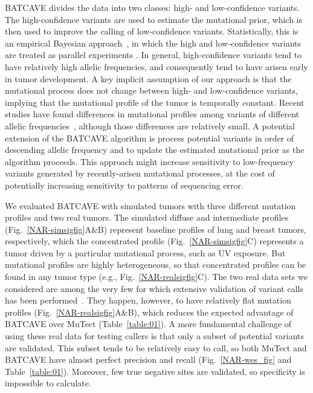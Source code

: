 \documentclass[a4,center,fleqn]{NAR}
\newcommand{\batcave}{BATCAVE\xspace}
\begin{document}
\batcave divides the data into two classes: high- and low-confidence variants.
The high-confidence variants are used to estimate the mutational prior, which is then used to improve the calling of low-confidence variants.
Statistically, this is an empirical Bayesian approach~\citep{Robbins1954}, in which the high and low-confidence variants are treated as parallel experiments \citep{Morris1983,Efron2014}. 
In general, high-confidence variants tend to have relatively high allelic frequencies, and consequently tend to have arisen early in tumor development.
A key implicit assumption of our approach is that the mutational process does not change between high- and low-confidence variants, implying that the mutational profile of the tumor is temporally constant.
Recent studies have found differences in mutational profiles among variants of different allelic frequencies~\citep{Rubanova2018a}, although those differences are relatively small.
A potential extension of the \batcave algorithm is process potential variants in order of descending allelic frequency and to update the estimated mutational prior as the algorithm proceeds.
This approach might increase sensitivity to low-frequency variants generated by recently-arisen mutational processes, at the cost of potentially increasing sensitivity to patterns of sequencing error.


We evaluated \batcave with simulated tumors with three different mutation profiles and two real tumors.
The simulated diffuse and intermediate profiles (Fig.~\ref{NAR-simsigfig}A\&B) represent baseline profiles of lung and breast tumors, respectively, which the concentrated profile (Fig.~\ref{NAR-simsigfig}C) represents a tumor driven by a particular mutational process, such as UV exposure.
But mutational profiles are highly heterogeneous, so that concentrated profiles can be found in any tumor type (e.g., Fig.~\ref{NAR-realsigfig}C).
The two real data sets we considered are among the very few for which extensive validation of variant calls has been performed~\cite{Griffith2015, Shi2018}.
They happen, however, to have relatively flat mutation profiles (Fig.~\ref{NAR-realsigfig}A\&B), which reduces the expected advantage of \batcave over MuTect (Table~\ref{table:01}).
A more fundamental challenge of using these real data for testing callers is that only a subset of potential variants are validated.
This subset tends to be relatively easy to call, so both MuTect and \batcave have almost perfect precision and recall (Fig.~\ref{NAR-wes_fig} and Table~\ref{table:01}).
Moreover, few true negative sites are validated, so specificity is impossible to calculate.
\end{document}
